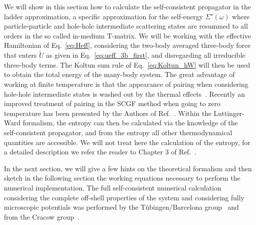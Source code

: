 We will show in this section how to calculate the self-consistent propagator in the ladder approximation, a specific approximation for the self-energy $\Sigma^\star(\omega)$ where particle-particle and hole-hole intermediate scattering states are resummed to all orders in the so called in-medium T-matrix. We will be working with the effective Hamiltonian of Eq.~\eqref{eq:Heff}, considering the two-body averaged three-body force that enters $\widetilde U$ as given in Eq.~\eqref{eq:ueff_3b_first}, and disregarding all irreducible three-body terms. The Koltun sum rule of Eq.~\eqref{eq:Koltun_hW} will then be used to obtain the total energy of the many-body system. The great advantage of working at finite temperature is that the appearance of pairing when considering hole-hole intermediate states is washed out by the thermal effects~\cite{ch11_Alm1996}. Recently an improved treatment of pairing in the SCGF method when going to zero temperature has been presented by the Authors of Ref.~\cite{ch11_ding2016}. Within the Luttinger-Ward formalism, the entropy can then be calculated via the knowledge of the self-consistent propagator, and from the entropy all other thermodynamical quantities are accessible. We will not treat here the calculation of the entropy, for a detailed description we refer the reader to Chapter 3 of Ref.~\cite{ch11_Rios2007PhD}.

In the next section, we will give a few hints on the theoretical formalism and then sketch in the following section the working equations necessary to perform the numerical implementation. The full self-consistent numerical calculation considering the complete off-shell properties of the system and considering fully microscopic potentials was performed by the T\"ubingen/Barcelona group~\cite{ch11_Frick2003,ch11_Frick2004PhD,ch11_Frick2005,ch11_Rios2006C74,ch11_Rios2008,ch11_Rios2009} and from the Cracow group~\cite{ch11_Soma2006,ch11_Soma2008,ch11_Soma2009,ch11_Soma2009phd}.

